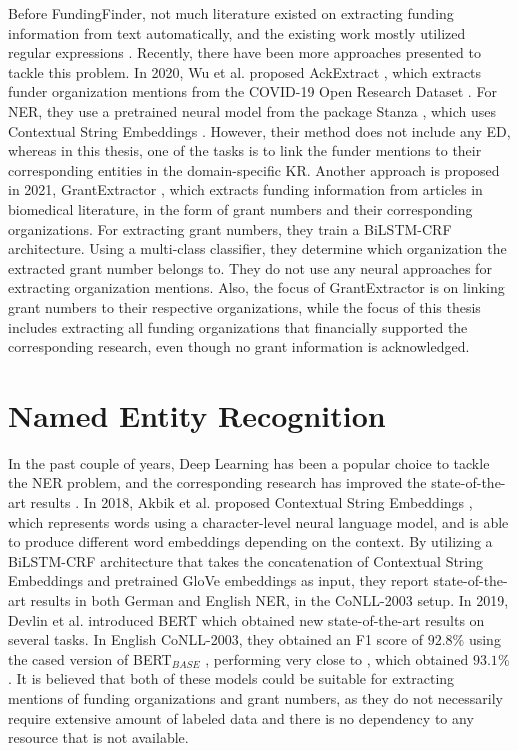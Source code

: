 \documentclass{report}
\theoremstyle{definition}
\theoremstyle{remark}
\begin{document}
    Before FundingFinder, not much literature existed on extracting funding information from text automatically, and the existing work mostly utilized regular expressions \cite{ElsPaper}. Recently, there have been more approaches presented to tackle this problem. In 2020, Wu et al. proposed AckExtract  \cite{AckExtract}, which extracts funder organization mentions from the COVID-19 Open Research Dataset \cite{CORD}. For NER, they use a pretrained neural model from the package Stanza \cite{stanza}, which uses Contextual String Embeddings \cite{flairpaper}. However, their method does not include any ED, whereas in this thesis, one of the tasks is to link the funder mentions to their corresponding entities in the domain-specific KR. Another approach is proposed in 2021, GrantExtractor \cite{GrantExtractor}, which extracts funding information from articles in biomedical literature, in the form of grant numbers and their corresponding organizations. For extracting grant numbers, they train a BiLSTM-CRF \cite{BiLSTMCRF} architecture. Using a multi-class classifier, they determine which organization the extracted grant number belongs to. They do not use any neural approaches for extracting organization mentions. Also, the focus of GrantExtractor is on linking grant numbers to their respective organizations, while the focus of this thesis includes extracting all funding organizations that financially supported the corresponding research, even though no grant information is acknowledged.

\section{Named Entity Recognition}
\label{sota1}
In the past couple of years, Deep Learning has been a popular choice to tackle the NER problem, and the corresponding research has improved the state-of-the-art results \cite{NERsurvey}. In 2018, Akbik et al. proposed Contextual String Embeddings \cite{flairpaper}, which represents words using a character-level neural language model, and is able to produce different word embeddings depending on the context. By utilizing a BiLSTM-CRF architecture that takes the concatenation of Contextual String Embeddings and pretrained GloVe embeddings \cite{glove} as input, they report state-of-the-art results in both German and English NER, in the CoNLL-2003 \cite{conll} setup. In 2019, Devlin et al. introduced BERT \cite{BERT} which obtained new state-of-the-art results on several tasks. In English CoNLL-2003, they obtained an F1 score of $92.8\%$ using the cased version of BERT$_{BASE}$ \cite{BERT}, performing very close to \cite{flairpaper}, which obtained $93.1\%$. It is believed that both of these models could be suitable for extracting mentions of funding organizations and grant numbers, as they do not necessarily require extensive amount of labeled data and there is no dependency to any resource that is not available.
\end{document}
